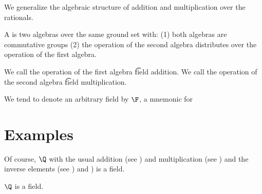 

We generalize the algebraic structure of addition and multiplication over the rationals.


A  is two algebras over
the same ground set with:
(1) both algebras are commutative groups
(2) the operation of the second algebra
distributes over the operation of the first
algebra.

We call the operation of the first algebra
\t{field addition}.
We call the operation of the second algebra
\t{field multiplication}.


We tend to denote an arbitrary field by $\F$, a mnemonic for 

\section{Examples}

Of course, $\Q$ with the usual addition (see ) and multiplication (see ) and the inverse elements (see ) and ) is a field.

\begin{proposition}
  $\Q$ is a field.
\end{proposition}

\blankpage
